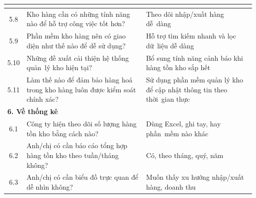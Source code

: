 \documentclass[a4paper,12pt]{report}
\begin{document}
\begin{longtable}{|c|p{8cm}|p{7cm}|}
\begin{itemize}
    \end{itemize}                                                                                                                                                                                                                                                \\
    \hline
    5.8          & Kho hàng cần có những tính năng nào để hỗ trợ công việc tốt hơn?                                                        & Theo dõi nhập/xuất hàng dễ~dàng                                                                                       \\
    \hline
    5.9          & Phần mềm kho hàng nên có giao diện như thế nào để dễ sử dụng?                                                           & Hỗ trợ tìm kiếm nhanh và lọc dữ~liệu dễ dàng                                                                            \\
    \hline
    5.10         & Những đề xuất cải thiện hệ thống quản~lý kho hiện tại?                                                                  & Bổ sung tính năng cảnh báo khi hàng tồn kho sắp hết                                                                    \\
    \hline
    5.11         & Làm thế nào để đảm bảo  hàng hoá trong kho hàng luôn được kiểm soát chính xác?                                          & Sử dụng phần mềm quản lý kho để cập nhật thông tin theo thời~gian thực                                                  \\
    \hline
    \multicolumn{3}{|l|}{\textbf{6. Về thống kê}}                                                                                                                                                                                                                     \\
    \hline
    6.1          & Công ty hiện theo dõi số lượng hàng tồn kho bằng cách nào?                                                              & Dùng Excel, ghi tay, hay phần~mềm nào khác                                                                              \\
    \hline
    6.2          & Anh/chị có cần báo cáo tổng hợp hàng tồn kho theo tuần/tháng không?                                                     & Có, theo tháng, quý, năm                                                                                               \\
    \hline
    6.3          & Anh/chị có cần biểu đồ trực quan để dễ nhìn không?                                                                      & Muốn thấy xu hướng nhập/xuất hàng, doanh thu                                                                            \\

\end{longtable}
\end{document}
